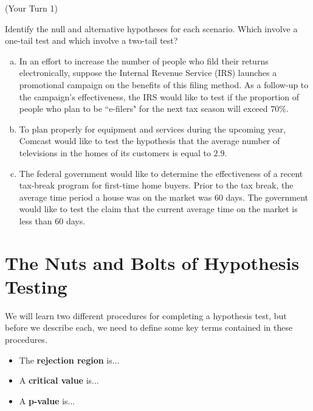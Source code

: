 \documentclass[12pt, letterpaper]{article}
\newcounter{exercise}
\theoremstyle{definition}
\begin{document}
\newpage



\begin{exercise}  (Your Turn 1)

Identify the null and alternative hypotheses for each scenario.  Which involve a one-tail test and which involve a two-tail test?

\end{exercise}

\begin{enumerate}[(a)]

\item In an effort to increase the number of people who fild their returns electronically, suppose the Internal Revenue Service (IRS) launches a promotional campaign on the benefits of this filing method.  As a follow-up to the campaign's effectiveness, the IRS would like to test if the proportion of people who plan to be ``e-filers" for the next tax season will exceed $70\%$.

\vfill

\item To plan properly for equipment and services during the upcoming year, Comcast would like to test the hypothesis that the average number of televisions in the homes of its customers is equal to $2.9$.

\vfill

\item The federal government would like to determine the effectiveness of a recent tax-break program for first-time home buyers.  Prior to the tax break, the average time period a house was on the market was $60$ days.  The government would like to test the claim that the current average time on the market is less than $60$ days.

\vfill

\end{enumerate}

\newpage

\section*{The Nuts and Bolts of Hypothesis Testing}

\noindent We will learn two different procedures for completing a hypothesis test, but before we describe each, we need to define some key terms contained in these procedures.

\begin{defn}
\begin{itemize}

\item The \textbf{rejection region} is...
\vspace*{.5in}

\item A \textbf{critical value} is...
\vspace*{.5in}

\item A \textbf{p-value} is...
\vspace*{.5in}

\end{itemize}
\end{defn}
\end{document}
